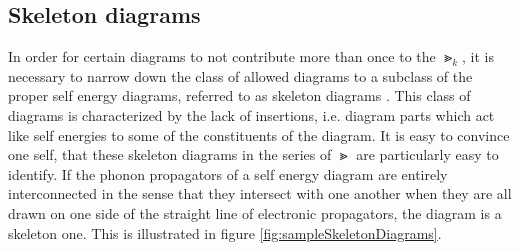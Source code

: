 \subsection{Skeleton diagrams}

In order for certain diagrams to not contribute more than once to the $ \Gt_k $, it is necessary to narrow down the class of allowed diagrams to a subclass of the proper self energy diagrams, referred to as skeleton diagrams \cite{mattuck2012guide}. This class of diagrams is characterized by the lack of insertions, i.e. diagram parts which act like self energies to some of the constituents of the diagram. It is easy to convince one self, that these skeleton diagrams in the series of $ \Gt $ are particularly easy to identify. If the phonon propagators of a self energy diagram are entirely interconnected in the sense that they intersect with one another when they are all drawn on one side of the straight line of electronic propagators, the diagram is a skeleton one. This is illustrated in figure \ref{fig:sampleSkeletonDiagrams}.
